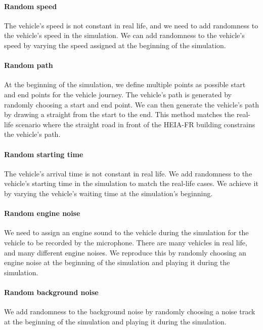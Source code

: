 \paragraph{Random speed}

The vehicle's speed is not constant in real life, and we need to add randomness to the vehicle's speed in the simulation. We can add randomness to the vehicle's speed by varying the speed assigned at the beginning of the simulation. 

\paragraph{Random path}

At the beginning of the simulation, we define multiple points as possible start and end points for the vehicle journey. The vehicle's path is generated by randomly choosing a start and end point. We can then generate the vehicle's path by drawing a straight from the start to the end. This method matches the real-life scenario where the straight road in front of the HEIA-FR building constrains the vehicle's path. 

\paragraph{Random starting time}

The vehicle's arrival time is not constant in real life. We add randomness to the vehicle's starting time in the simulation to match the real-life cases. We achieve it by varying the vehicle's waiting time at the simulation's beginning.

\paragraph{Random engine noise}

We need to assign an engine sound to the vehicle during the simulation for the vehicle to be recorded by the microphone. There are many vehicles in real life, and many different engine noises. We reproduce this by randomly choosing an engine noise at the beginning of the simulation and playing it during the simulation. 

\paragraph{Random background noise}

We add randomness to the background noise by randomly choosing a noise track at the beginning of the simulation and playing it during the simulation.

